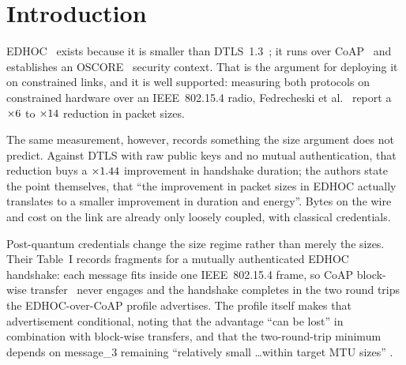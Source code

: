 %
%
%

\section{Introduction}
\label{sec:intro}

EDHOC~\cite{rfc9528} exists because it is smaller than DTLS~1.3~\cite{rfc9147}; it runs over
CoAP~\cite{rfc7252} and establishes an OSCORE~\cite{rfc8613} security context. That is the
argument for deploying it on constrained links, and it is well supported: measuring both
protocols on constrained hardware over an IEEE~802.15.4 radio, Fedrecheski et
al.\ \cite{fedrecheski2024} report a $\times6$ to $\times14$ reduction in packet sizes.

The same measurement, however, records something the size argument does not predict. Against
DTLS with raw public keys and no mutual authentication, that reduction buys a $\times1.44$
improvement in handshake duration; the authors state the point themselves, that ``the
improvement in packet sizes in EDHOC actually translates to a smaller improvement in duration
and energy''. Bytes on the wire and cost on the link are already only loosely coupled, with
classical credentials.

Post-quantum credentials change the size regime rather than merely the sizes. Their Table~I
records \citedFedrEdhocFrags{} fragments for a mutually authenticated EDHOC handshake: each message fits inside
one IEEE~802.15.4 frame, so CoAP block-wise transfer~\cite{rfc7959} never engages and the
handshake completes in the two round trips the EDHOC-over-CoAP profile advertises. The profile
itself makes that advertisement conditional, noting that the advantage ``can be lost'' in
combination with block-wise transfers, and that the two-round-trip minimum depends on
message\_3 remaining ``relatively small \ldots within target MTU sizes'' \cite{rfc9668}.

